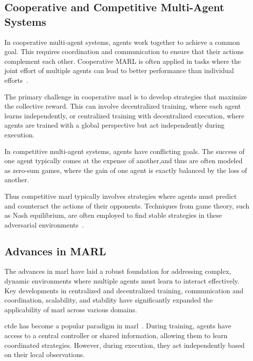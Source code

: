 \subsection*{Cooperative and Competitive Multi-Agent Systems}
In cooperative multi-agent systems, agents work together to achieve a common goal. 
This requires coordination and communication to ensure that their actions complement each other. 
Cooperative MARL is often applied in tasks where the joint effort of multiple agents can lead to 
better performance than individual efforts~\cite{littman1994}.

The primary challenge in cooperative \gls{marl} is to develop strategies that maximize the 
collective reward. This can involve decentralized training, where each agent learns independently, 
or centralized training with decentralized execution, where agents are trained with a global 
perspective but act independently during execution.

In competitive multi-agent systems, agents have conflicting goals. The success of one agent 
typically comes at the expense of another,and thus are often modeled as zero-sum games, 
where the gain of one agent is exactly balanced by the loss of another.

Thus competitive \gls{marl} typically involves strategies where agents must predict and 
counteract the actions of their opponents. Techniques from game theory, such as Nash equilibrium, 
are often employed to find stable strategies in these adversarial environments~\cite{busoniu2008}.

\subsection*{Advances in MARL}
The advances in \gls{marl} have laid a robust foundation for addressing complex, 
dynamic environments where multiple agents must learn to interact effectively.
Key developments in centralized and decentralized training, communication and coordination, 
scalability, and stability have significantly expanded the applicability of 
\gls{marl} across various domains. 

\Gls{ctde} has become a popular paradigm in \gls{marl}~\cite{rashid2018,foerster2017,lowe2020}. 
During training, agents have access to a central controller or shared information, 
allowing them to learn coordinated strategies. 
However, during execution, they act independently based on their local observations.


